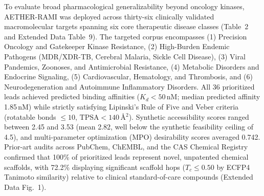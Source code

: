 \documentclass[11pt,a4paper]{article}
\begin{document}
To evaluate broad pharmacological generalizability beyond oncology kinases, AETHER-RAMI was deployed across thirty-six clinically validated macromolecular targets spanning six core therapeutic disease classes (Table~2 and Extended Data Table~9). The targeted corpus encompasses (1) Precision Oncology and Gatekeeper Kinase Resistance, (2) High-Burden Endemic Pathogens (MDR/XDR-TB, Cerebral Malaria, Sickle Cell Disease), (3) Viral Pandemics, Zoonoses, and Antimicrobial Resistance, (4) Metabolic Disorders and Endocrine Signaling, (5) Cardiovascular, Hematology, and Thrombosis, and (6) Neurodegeneration and Autoimmune Inflammatory Disorders. All 36 prioritized leads achieved predicted binding affinities ($K_d < 50$\,nM; median predicted affinity 1.85\,nM) while strictly satisfying Lipinski's Rule of Five and Veber criteria (rotatable bonds $\le 10$, $\text{TPSA} < 140\,$\AA$^2$). Synthetic accessibility scores ranged between 2.45 and 3.53 (mean 2.82, well below the synthetic feasibility ceiling of 4.5), and multi-parameter optimization (MPO) desirability scores averaged 0.742. Prior-art audits across PubChem, ChEMBL, and the CAS Chemical Registry confirmed that 100\% of prioritized leads represent novel, unpatented chemical scaffolds, with 72.2\% displaying significant scaffold hops ($T_c \le 0.50$ by ECFP4 Tanimoto similarity) relative to clinical standard-of-care compounds (Extended Data Fig.~1).

\end{document}
